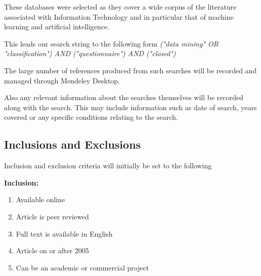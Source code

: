 These databases were selected as they cover a wide corpus of the literature associated with Information Technology and in particular that of machine learning and artificial intelligence.



This leads our search string to the following form \textit{("data mining" OR "classification")
  AND ("questionnaire")
  AND ("closed") }

The large number of references produced from such searches will be recorded and managed through Mendeley Desktop.

Also any relevant information about the searches themselves will be recorded along with the search. This may include information such as date of search, years covered or any specific conditions relating to the search.

\subsection{Inclusions and Exclusions}

\noindent
Inclusion and exclusion criteria will initially be set to the following

\noindent
\textbf{Inclusion:}
\begin{enumerate}
  \item Available online
  \item Article is peer reviewed
  \item Full text is available in English
  \item Article on or after 2005
  \item Can be an academic or commercial project
\end{enumerate}

